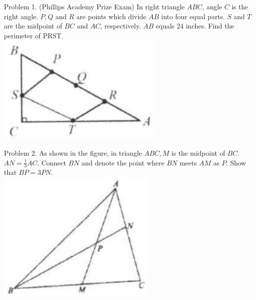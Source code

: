 \documentclass[10pt]{article}
\begin{document}
Problem 1. (Phillips Academy Prize Exam) In right triangle \(A B C\), angle \(C\) is the right angle. \(P, Q\) and \(R\) are points which divide \(A B\) into four equal parts. \(S\) and \(T\) are the midpoint of \(B C\) and \(A C\), respectively. \(A B\) equals 24 inches. Find the perimeter of PRST.\\
\includegraphics[max width=\textwidth, center]{2025_04_17_97bc1f7e44d93c271a88g-044(3)}

Problem 2. As shown in the figure, in triangle \(A B C, M\) is the midpoint of \(B C\). \(A N=\frac{1}{3} A C\). Connect \(B N\) and denote the point where \(B N\) meets \(A M\) as \(P\). Show that \(B P=3 P N\).\\
\includegraphics[max width=\textwidth, center]{2025_04_17_97bc1f7e44d93c271a88g-044}
\end{document}
